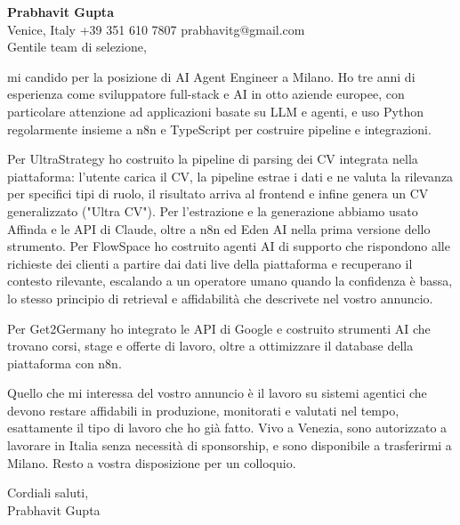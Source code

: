 \documentclass[a4paper,10.5pt]{article}
\begin{document}
\textbf{Prabhavit Gupta}\\
Venice, Italy \textbar{} +39 351 610 7807 \textbar{} prabhavitg@gmail.com\\[10pt]
Gentile team di selezione,

mi candido per la posizione di AI Agent Engineer a Milano. Ho tre anni di esperienza come sviluppatore full-stack e AI in otto aziende europee, con particolare attenzione ad applicazioni basate su LLM e agenti, e uso Python regolarmente insieme a n8n e TypeScript per costruire pipeline e integrazioni.

Per UltraStrategy ho costruito la pipeline di parsing dei CV integrata nella piattaforma: l'utente carica il CV, la pipeline estrae i dati e ne valuta la rilevanza per specifici tipi di ruolo, il risultato arriva al frontend e infine genera un CV generalizzato ("Ultra CV"). Per l'estrazione e la generazione abbiamo usato Affinda e le API di Claude, oltre a n8n ed Eden AI nella prima versione dello strumento. Per FlowSpace ho costruito agenti AI di supporto che rispondono alle richieste dei clienti a partire dai dati live della piattaforma e recuperano il contesto rilevante, escalando a un operatore umano quando la confidenza è bassa, lo stesso principio di retrieval e affidabilità che descrivete nel vostro annuncio.

Per Get2Germany ho integrato le API di Google e costruito strumenti AI che trovano corsi, stage e offerte di lavoro, oltre a ottimizzare il database della piattaforma con n8n.

Quello che mi interessa del vostro annuncio è il lavoro su sistemi agentici che devono restare affidabili in produzione, monitorati e valutati nel tempo, esattamente il tipo di lavoro che ho già fatto. Vivo a Venezia, sono autorizzato a lavorare in Italia senza necessità di sponsorship, e sono disponibile a trasferirmi a Milano. Resto a vostra disposizione per un colloquio.

Cordiali saluti,\\
Prabhavit Gupta
\end{document}
